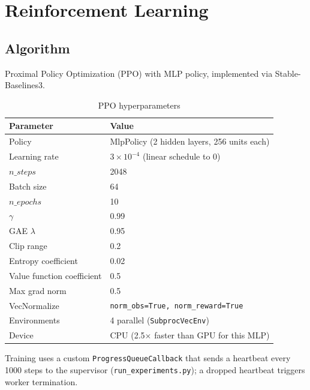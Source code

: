 \documentclass[11pt,a4paper]{article}
\begin{document}
\section{Reinforcement Learning}

\subsection{Algorithm}
Proximal Policy Optimization (PPO) with MLP policy, implemented via Stable-Baselines3.
\begin{table}[H]
\centering
\caption{PPO hyperparameters}
\label{tab:ppo}
\begin{tabular}{@{}ll@{}}
\toprule
\textbf{Parameter} & \textbf{Value} \\
\midrule
Policy & MlpPolicy (2 hidden layers, 256 units each) \\
Learning rate & $3 \times 10^{-4}$ (linear schedule to 0) \\
$n\_steps$ & 2048 \\
Batch size & 64 \\
$n\_epochs$ & 10 \\
$\gamma$ & 0.99 \\
GAE $\lambda$ & 0.95 \\
Clip range & 0.2 \\
Entropy coefficient & 0.02 \\
Value function coefficient & 0.5 \\
Max grad norm & 0.5 \\
VecNormalize & \texttt{norm\_obs=True, norm\_reward=True} \\
Environments & 4 parallel (\texttt{SubprocVecEnv}) \\
Device & CPU (2.5$\times$ faster than GPU for this MLP) \\
\bottomrule
\end{tabular}
\end{table}

Training uses a custom \texttt{ProgressQueueCallback} that sends a heartbeat every 1000 steps to the supervisor (\texttt{run\_experiments.py}); a dropped heartbeat triggers worker termination.
\end{document}
